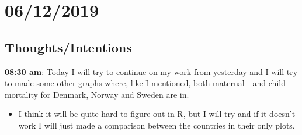 \documentclass{article}
\begin{document}
\section{06/12/2019}
\subsection{Thoughts/Intentions}
\textbf{08:30 am}:  Today I will try to continue on my work from yesterday and I will try to made some other graphs where, like I mentioned, both maternal - and child mortality for Denmark, Norway and Sweden are in. 
\begin{itemize}
    \item I think it will be quite hard to figure out in R, but I will try and if it doesn't work I will just made a comparison between the countries in their only plots.  
\end{itemize}
\end{document}
